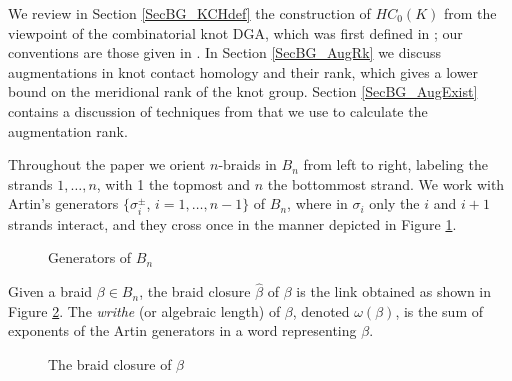 \documentclass[11pt]{amsart}
\def\s{{\sigma}}
\theoremstyle{definition}
\begin{document}
  We review in Section \ref{SecBG_KCHdef} the construction of $HC_0(K)$ from the viewpoint of the combinatorial knot DGA, which was first defined in \cite{Ng08}; our conventions are those given in \cite{Ng12}. In Section \ref{SecBG_AugRk} we discuss augmentations in knot contact homology and their rank, which gives a lower bound on the meridional rank of the knot group. Section \ref{SecBG_AugExist} contains a discussion of techniques from \cite{Cor13a} that we use to calculate the augmentation rank.

  Throughout the paper we orient $n$-braids in $B_n$ from left to right, labeling the strands $1,\ldots, n$, with 1 the topmost and $n$ the bottommost strand. We work with Artin's generators $\{\sigma_i^{\pm}$, $i=1,\ldots,n-1\}$ of $B_n$, where in $\s_i$ only the $i$ and $i+1$ strands interact, and they cross once in the manner depicted in Figure \ref{fig:BraidGens}.
      \begin{figure}[ht]
        \caption{Generators of $B_n$}
        \label{fig:BraidGens}
      \end{figure}
    Given a braid $\beta\in B_n$, the braid closure $\hat{\beta}$ of $\beta$ is the link obtained as shown in Figure \ref{fig:BClosure}. The \emph{writhe} (or algebraic length) of $\beta$, denoted $\omega(\beta)$, is the sum of exponents of the Artin generators in a word representing $\beta$.

    \begin{figure}[ht]
      \caption{The braid closure of $\beta$}
      \label{fig:BClosure}
    \end{figure}
\end{document}
